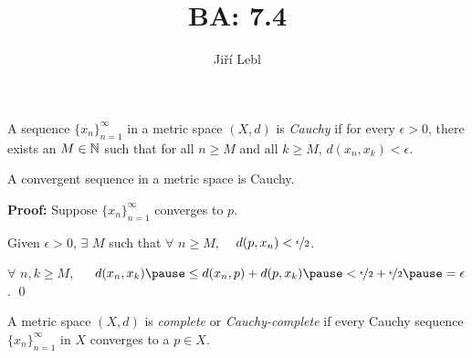 \documentclass[10pt,aspectratio=149]{beamer}
\author{Ji\v{r}\'i Lebl}
\institute[OSU]{%
Departemento pri Matematiko de Oklahoma {\^S}tata Universitato}
\title{BA: 7.4}
\date{}
\begin{document}
\begin{frame}
\titlepage
\end{frame}

\begin{frame}
\begin{definition}
A sequence $\{ x_n \}_{n=1}^\infty$ in a metric space $(X,d)$ is \emph{Cauchy}
\pause
if
for every $\epsilon > 0$, there exists an $M \in {\mathbb{N}}$ such that
for all $n \geq M$ and all $k \geq M$,
\quad $d(x_n, x_k) < \epsilon$.
\end{definition}

\pause
\begin{proposition}
A convergent sequence in a metric space is Cauchy.
\end{proposition}

\pause
\textbf{Proof:}
Suppose $\{ x_n \}_{n=1}^\infty$ converges to $p$.

\pause
\medskip

\pause
Given $\epsilon > 0$, $\exists$ $M$ such that $\forall$ $n \geq M$,
~~$d(p,x_n) < \nicefrac{\epsilon}{2}$.

\pause
\medskip

\thus \quad $\forall$ $n,k \geq M$, ~~
$d(x_n,x_k)
\pause
\leq d(x_n,p) + d(p,x_k)
\pause
< \nicefrac{\epsilon}{2} + \nicefrac{\epsilon}{2}
\pause
= \epsilon$.
\qed

\pause
\begin{definition}
A metric space $(X,d)$ is
\emph{complete} or \emph{Cauchy-complete}
if every Cauchy sequence $\{ x_n \}_{n=1}^\infty$ in $X$
converges to a $p \in X$.
\end{definition}

\end{frame}
\end{document}
